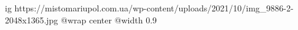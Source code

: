  
 
 
 
 

\ifcmt
  ig https://mistomariupol.com.ua/wp-content/uploads/2021/10/img_9886-2-2048x1365.jpg
  @wrap center
  @width 0.9
\fi
